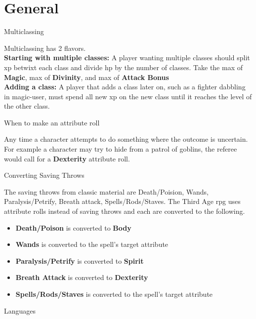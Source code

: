 \section*{General} %
\begin{mercHeading}
Multiclassing
\end{mercHeading}
Multiclassing has 2 flavors.\\
\textbf{Starting with multiple classes:} A player wanting multiple classes should split xp betwixt each class and divide hp by the number of classes. Take the max of \textbf{Magic}, max of \textbf{Divinity}, and max of \textbf{Attack Bonus} \\
\textbf{Adding a class:} A player that adds a class later on, such as a fighter dabbling in magic-user, must spend all new xp on the new class until it reaches the level of the other class.
\begin{mercHeading}
When to make an attribute roll
\end{mercHeading}
Any time a character attempts to do something where the outcome is uncertain. For example a character may try to hide from a patrol of goblins, the referee would call for a \textbf{Dexterity} attribute roll.
\begin{mercHeading}
Converting Saving Throws
\end{mercHeading}
The saving throws from classic material are Death/Poision, Wands, Paralysis/Petrify, Breath attack, Spells/Rods/Staves. The Third Age rpg uses attribute rolls instead of saving throws and each are converted to the following.
\begin{itemize}
\setlength\itemsep{0em}
	\item \textbf{Death/Poison} is converted to \textbf{Body}
	\item \textbf{Wands} is converted to the spell's target attribute
	\item \textbf{Paralysis/Petrify} is converted to \textbf{Spirit}
	\item \textbf{Breath Attack} is converted to \textbf{Dexterity}
	\item \textbf{Spells/Rods/Staves} is converted to the spell's target attribute
\end{itemize}


\begin{mercHeading}
Languages
\end{mercHeading}

